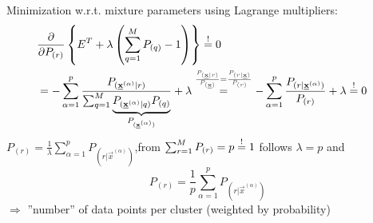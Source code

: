 Minimization w.r.t. mixture parameters using Lagrange multipliers:\\\vspace{-4mm}
\begin{align*}
 &\frac{\partial}{\partial P_{(r)}} \left\{ E^T + \lambda \left( \sum_{q=1}^{M} P_{(q)} - 1 \right)  \right\} \eqexcl 0 \\
 &= - \sum_{\alpha=1}^{p} \frac{P_{(\vec{x}^{(\alpha)} | r)}}{\sum_{q=1}^{M} \underbrace{P_{(\vec{x}^{(\alpha)} | q)} P_{(q)}}_{P_{(\vec{x}^{(\alpha)})}}} + \lambda \overset{{\color{darkgray}\frac{P_{(\vec{x} | r)}}{P_{(\vec{x})}} = \frac{P_{(r | \vec{x})}}{P_{(r)}}} }{=} - \sum_{\alpha=1}^{p} \frac{P_{(r | \vec{x}^{(\alpha)})}}{P_{(r)}} + \lambda \eqexcl 0 \quad 
 \end{align*}
 $P_{(r)} = \frac{1}{\lambda} \sum_{\alpha=1}^{p} P_{(r | \vec{x}^{(\alpha)})}$,\quad from $\sum_{r=1}^{M} P_{(r)} = p \stackrel{\mathrm{!}}{=} 1$ follows $\lambda=p$ and 
\begin{equation*}
 \boxed{P_{(r)} = \frac{1}{p} \sum_{\alpha = 1}^{p} P_{(r | \vec{x}^{(\alpha)})}} 
\end{equation*}
$\Rightarrow$ ''number'' of data points per cluster (weighted by probability)

